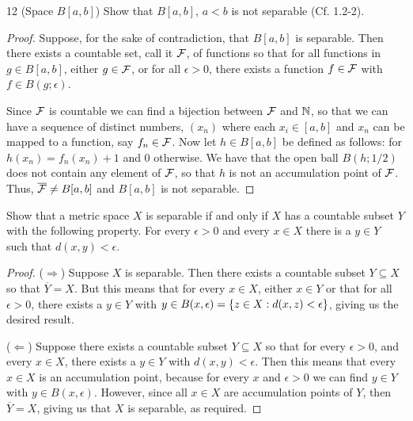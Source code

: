 \begin{exercise}{12 (Space $B[a,b]$)}
 Show that $B[a,b]$, $a<b$ is not separable (Cf. 1.2-2).
\end{exercise}
\begin{proof}
Suppose, for the sake of contradiction, that $B[a,b]$ is separable. Then there exists a countable set, call it $\mathcal{F}$, of functions so that for all functions in $g\in B[a,b]$, either $g\in\mathcal{F}$, or for all $\epsilon>0$, there exists a function $f\in\mathcal{F}$ with $f\in B(g;\epsilon)$.

Since $\mathcal{F}$ is countable we can find a bijection between $\mathcal{F}$ and $\mathbb{N}$, so that we can have a sequence of distinct numbers, $(x_n)$ where each $x_i\in[a,b]$ and $x_n$ can be mapped to a function, say $f_n\in\mathcal{F}$. Now let $h\in B[a,b]$ be defined as follows: for $h(x_n)=f_n(x_n)+1$ and 0 otherwise. We have that the open ball $B(h;1/2)$ does not contain any element of $\mathcal{F}$, so that $h$ is not an accumulation point of $\mathcal{F}$. Thus, $\overline{\mathcal{F}}\neq B[a,b]$ and $B[a,b]$ is not separable. 
\end{proof}

\begin{exercise}{13}
Show that a metric space $X$ is separable if and only if $X$ has a countable subset $Y$ with the following property. For every $\epsilon>0$ and every $x\in X$ there is a $y\in Y$ such that $d(x,y)<\epsilon$.
\end{exercise}
\begin{proof}
($\Rightarrow$) Suppose $X$ is separable. Then there exists a countable subset $Y\subseteq X$ so that $\overline{Y}=X$. But this means that for every $x\in X$, either $x\in Y$ or that for all $\epsilon>0$, there exists a $y\in Y$ with $y\in B(x, \epsilon)=\{z\in X:d(x,z)<\epsilon\}$, giving us the desired result.

($\Leftarrow$) Suppose there exists a countable subset $Y\subseteq X$ so that for every $\epsilon>0$, and every $x\in X$, there exists a $y\in Y$ with $d(x,y)<\epsilon$. Then this means that every $x\in X$ is an accumulation point, because for every $x$ and $\epsilon>0$ we can find $y\in Y$ with $y\in B(x,\epsilon)$. However, since all $x\in X$ are accumulation points of $Y$, then $\overline{Y}=X$, giving us that $X$ is separable, as required.
\end{proof}

